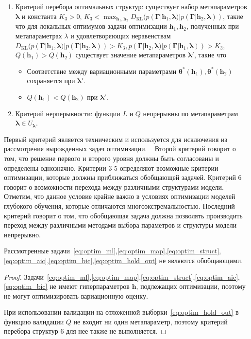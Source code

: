 \begin{defin}
\begin{enumerate}
\item Критерий перебора оптимальных структур: существует набор метапараметров $\boldsymbol{\lambda}$ и константа $K_3>0$, $K_3 < \max_{\mathbf{h}_1, \mathbf{h}_2} D_\text{KL}(p (\boldsymbol{\Gamma}|\mathbf{h}_1, \boldsymbol{\lambda}) | p (\boldsymbol{\Gamma}|\mathbf{h}_2, \boldsymbol{\lambda}))$, такие что для локальных оптимумов задачи оптимизации $\mathbf{h}_{1}, \mathbf{h}_2$, полученных при метапараметрах $\lambda$ и удовлетворяющих неравенствам $D_\text{KL}(p (\boldsymbol{\Gamma}|\mathbf{h}_1, \boldsymbol{\lambda})| p (\boldsymbol{\Gamma}|\mathbf{h}_2, \boldsymbol{\lambda})) > K_3, p(\boldsymbol{\Gamma}|\mathbf{h}_2, \boldsymbol{\lambda})| p(\boldsymbol{\Gamma}|\mathbf{h}_1, \boldsymbol{\lambda})) > K_3$, $Q(\mathbf{h}_1) > Q(\mathbf{h}_2)$  существует значение метапараметров $\boldsymbol{\lambda}'$, такие что
\begin{itemize}
\item Соответствие между вариационными параметрами $\boldsymbol{\theta}^{*}(\mathbf{h}_1), \boldsymbol{\theta}^{*}(\mathbf{h}_2)$ сохраняется при  $\boldsymbol{\lambda}'$.
\item  $Q(\mathbf{h}_1) < Q(\mathbf{h}_2)$ при $\boldsymbol{\lambda}'$.
\end{itemize}


\item Критерий нерперывности: функции $L$ и $Q$ непрерывны по метапараметрам $\boldsymbol{\lambda} \in U_{\boldsymbol{\lambda}}$.
\end{enumerate}
\end{defin}
Первый критерий является техническим и используется для исключения из рассмотрения вырожденных задач оптимизации.  
Второй критерий говорит о том, что решение первого и второго уровня должны быть согласованы и определены однозначно.
Критерии 3-5 определяют возможные критерии оптимизации, которые должны приближаться обобщающей задачей.
Критерий 6 говорит о возможности перехода между различными структурами модели. Отметим, что данное условие крайне важно в условиях оптимизации моделей глубокого обучения, которые отличаются многоэкстремальностью.
Последний критерий говорит о том, что обобщающая задача должна позволять производить переход между различными методами выбора  параметров и структуры модели непрерывно.

\begin{theorem}Рассмотренные задачи~\eqref{eq:optim_ml},\eqref{eq:optim_map},\eqref{eq:optim_struct},\eqref{eq:optim_aic},\eqref{eq:optim_bic},\eqref{eq:optim_hold_out} не являются обобщающими.
\end{theorem}
\begin{proof}
Задачи~\eqref{eq:optim_ml},\eqref{eq:optim_map},\eqref{eq:optim_struct},\eqref{eq:optim_aic},\eqref{eq:optim_bic} не имеют гиперпараметров $\mathbf{h}$, подлежащих оптимизации, поэтому не могут оптимизировать вариационную оценку.

При  использовании валидации на отложенной выборки~\eqref{eq:optim_hold_out} в функцию валидации $Q$ не входит ни один метапараметр, поэтому критерий перебора структур 6 для нее также не выполняется. 

\end{proof}

